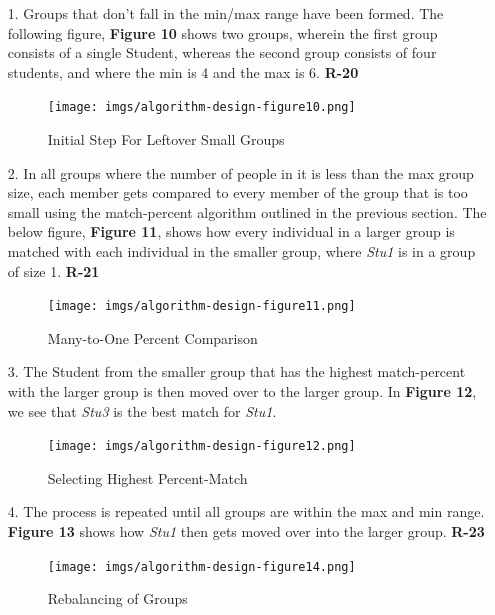 \documentclass[12pt,letterpaper]{article}
\begin{document}
\begin{enumerate}
	\item[1.] Groups that don't fall in the min/max range have been formed. The following figure, {\bf Figure 10} shows two groups, wherein the first group consists of a single Student, whereas the second group consists of four students, and where the min is 4 and the max is 6. {\bf R-20}
\begin{figure}[H]
	\caption{Initial Step For Leftover Small Groups}
	\begin{center}
		\texttt{[image: imgs/algorithm-design-figure10.png]}
	\end{center}
\end{figure}
\newpage{}
	\item[2.] In all groups where the number of people in it is less than the max group size, each member gets compared to every member of the group that is too small using the match-percent algorithm outlined in the previous section. The below figure, {\bf Figure 11}, shows how every individual in a larger group is matched with each individual in the smaller group, where {\it Stu1} is in a group of size 1. {\bf R-21}
\begin{figure}[H]
	\caption{Many-to-One Percent Comparison}
	\begin{center}
		\texttt{[image: imgs/algorithm-design-figure11.png]}
	\end{center}
\end{figure}
	\item[3.] The Student from the smaller group that has the highest match-percent with the larger group is then moved over to the larger group. In {\bf Figure 12}, we see that {\it Stu3} is the best match for {\it Stu1}.
\begin{figure}[H]
	\caption{Selecting Highest Percent-Match}
	\begin{center}
		\texttt{[image: imgs/algorithm-design-figure12.png]}
	\end{center}
\end{figure}
	\item[4.] The process is repeated until all groups are within the max and min range. {\bf Figure 13} shows how {\it Stu1} then gets moved over into the larger group. {\bf R-23}
\begin{figure}[H]
	\caption{Rebalancing of Groups}
	\begin{center}
		\texttt{[image: imgs/algorithm-design-figure14.png]}
	\end{center}
\end{figure}
\end{enumerate}
\newpage{}
\end{document}
